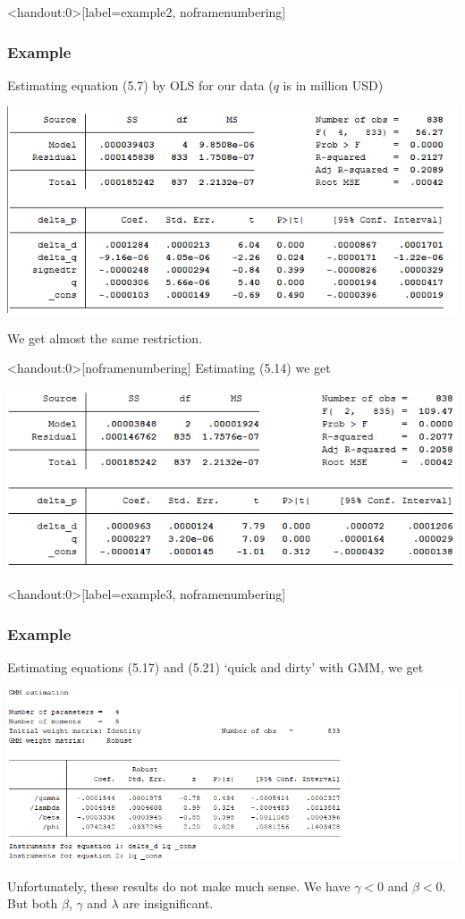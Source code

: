 \documentclass[english,10pt]{beamer}
\begin{document}
\begin{frame}<handout:0>[label=example2, noframenumbering]
\frametitle{Example}
Estimating equation (5.7) by OLS for our data ($q$ is in million USD)
\quad
\begin{center}
\includegraphics[scale=0.5]{pics/eq57}
\end{center}
We get almost the same restriction.
\end{frame}


\begin{frame}<handout:0>[noframenumbering]
Estimating (5.14) we get
\quad
\begin{center}
\includegraphics[scale=0.5]{pics/eq514}
\end{center}
\hyperlink{base}{}
\end{frame}


\begin{frame}<handout:0>[label=example3, noframenumbering]
\frametitle{Example}
Estimating equations (5.17) and (5.21) `quick and dirty' with GMM, we get
\begin{center}
\includegraphics[scale=0.42]{pics/eqgmm}
\end{center}
Unfortunately, these results do not make much sense. We have $\gamma<0$ and $\beta<0$. But both $\beta$, $\gamma$ and $\lambda$ are insignificant.
 \hyperlink{extending}{}
\end{frame}
\end{document}
